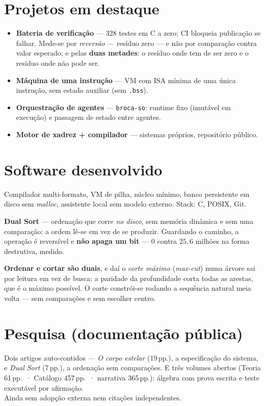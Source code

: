 \documentclass[11pt,a4paper]{article}
\begin{document}
\section*{Projetos em destaque}

\begin{itemize}
\item \textbf{Bateria de verificação} --- 328 testes em C a zero; CI bloqueia publicação se falhar.
Mede-se por \emph{reversão} --- resíduo zero --- e não por comparação contra valor esperado; e pelas
\textbf{duas metades}: o resíduo onde tem de ser zero e o resíduo onde não pode ser.
\item \textbf{Máquina de uma instrução} --- VM com ISA mínima de uma única instrução,
sem estado auxiliar (sem \texttt{.bss}).
\item \textbf{Orquestração de agentes} --- \texttt{broca-so}: runtime fixo (imutável em
execução) e passagem de estado entre agentes.
\item \textbf{Motor de xadrez + compilador} --- sistemas próprios, repositório público.
\end{itemize}

\section*{Software desenvolvido}

Compilador multi-formato, VM de pilha, núcleo mínimo, banco persistente em disco sem
\emph{malloc}, assistente local sem modelo externo. Stack: C, POSIX, Git.

\smallskip
\noindent \textbf{Dual Sort} --- ordenação que corre \emph{no disco}, sem memória dinâmica e sem
uma comparação: a ordem lê-se em vez de se produzir. Guardando o caminho, a operação é reversível e
\textbf{não apaga um bit} --- $0$ contra $25{,}6$ milhões na forma destrutiva, medido.

\smallskip
\noindent \textbf{Ordenar e cortar são duais}, e daí o \emph{corte máximo} (\emph{max-cut}) numa
árvore sai por leitura em vez de busca: a paridade da profundidade corta todas as arestas, que é o
máximo possível. O corte constrói-se rodando a sequência natural meia volta --- sem comparações e
sem escolher centro.

\section*{Pesquisa (documentação pública)}

Dois artigos auto-contidos --- \emph{O corpo estelar} (19\,pp.), a especificação do sistema, e
\emph{Dual Sort} (7\,pp.), a ordenação sem comparações. E três volumes abertos
(Teoria 61\,pp.\ · Catálogo 457\,pp.\ · narrativa 365\,pp.):
álgebra com prova escrita e teste executável por afirmação.
\\[1pt]
{\footnotesize\color{cinza}Ainda sem adopção externa nem citações independentes.}
\end{document}
